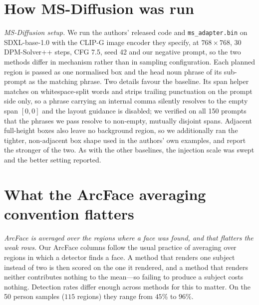 \documentclass[review,10pt,times]{elsarticle}
\begin{document}
\section{How MS-Diffusion was run}
\noindent\textit{MS-Diffusion setup.}
\label{sec:msdiffusion_setup}
We run the authors' released code and \texttt{ms\_adapter.bin} on
SDXL-base-1.0 with the CLIP-G image encoder they specify, at
$768\!\times\!768$, 30 DPM-Solver++ steps, CFG 7.5, seed 42 and our negative
prompt, so the two methods differ in mechanism rather than in sampling
configuration.  Each planned region is passed as one normalised box and the
head noun phrase of its sub-prompt as the matching phrase.  Two details
favour the baseline.  Its span helper matches on whitespace-split words and
strips trailing punctuation on the prompt side only, so a phrase carrying an
internal comma silently resolves to the empty span $[0,0]$ and the layout
guidance is disabled; we verified on all 150 prompts that the phrases we pass
resolve to non-empty, mutually disjoint spans.  Adjacent full-height boxes
also leave no background region, so we additionally ran the tighter,
non-adjacent box shape used in the authors' own examples, and report the
stronger of the two.  As with the other baselines, the injection scale was
swept and the better setting reported.

\section{What the ArcFace averaging convention flatters}
\noindent\textit{ArcFace is averaged over the regions where a face was found,
and that flatters the weak rows.}
Our ArcFace columns follow the usual practice of averaging over regions in
which a detector finds a face.  A method that renders one subject instead of
two is then scored on the one it rendered, and a method that renders neither
contributes nothing to the mean---so failing to produce a subject costs
nothing.  Detection rates differ enough across methods for this to matter.  On
the 50 person samples ($115$ regions) they range from $45\%$ to $96\%$.
\end{document}
